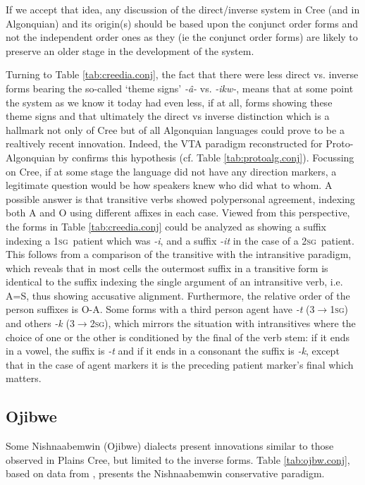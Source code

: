 \documentclass[twoside,a4paper,11pt]{article}
\newcommand{\sg}{\textsc{sg}}
\newcommand{\Σ}{\greek{Σ}}
\begin{document}
If we accept that idea, any discussion of the direct/inverse system in Cree (and in Algonquian) and its origin(s) should be based upon the conjunct order forms and not the independent order ones as they (ie the conjunct order forms) are likely to preserve an older stage in the development of the system.

Turning to Table \vref{tab:creedia.conj}, the fact that there were less direct vs. inverse forms bearing the so-called `theme signs' \textit{-â-} vs. \textit{-ikw-}, means that at some point the system as we know it today had even less, if at all, forms showing these theme signs and that ultimately the direct vs inverse distinction which is a hallmark not only of Cree but of all Algonquian languages could prove to be a realtively recent innovation. Indeed, the VTA paradigm reconstructed for Proto-Algonquian by \cite{goddard00cheyenne} confirms this hypothesis (cf. Table \vref{tab:protoalg.conj}). Focussing on Cree, if at some stage the language did not have any direction markers, a legitimate question would be how speakers knew who did what to whom. A possible answer is that transitive verbs showed polypersonal agreement, indexing both A and O using different affixes in each case. Viewed from this perspective, the forms in Table \vref{tab:creedia.conj} could be analyzed as showing a suffix indexing a 1\sg\ patient which was \textit{-i}, and a suffix \textit{-it} in the case of a 2\sg\ patient. This follows from a comparison of the transitive with the intransitive paradigm, which reveals that in most cells the outermost suffix in a transitive form is identical to the suffix indexing the single argument of an intransitive verb, i.e. A=S, thus showing accusative alignment. Furthermore, the relative order of the person suffixes is O-A. Some forms with a third person agent have \textit{-t} (3$\rightarrow$1\sg) and others \textit{-k} (3$\rightarrow$2\sg), which mirrors the situation with intransitives where the choice of one or the other is conditioned by the final of the verb stem: if it ends in a vowel, the suffix is \textit{-t} and if it ends in a consonant the suffix is \textit{-k}, except that in the case of agent markers it is the preceding patient marker's final which matters. 
\subsection{Ojibwe}
Some Nishnaabemwin (Ojibwe) dialects  present innovations similar to those observed in Plains Cree, but limited to the inverse forms. Table \ref{tab:ojbw.conj}, based on data from \citet[295]{valentine01grammar}, presents the Nishnaabemwin conservative paradigm. 
\end{document}
